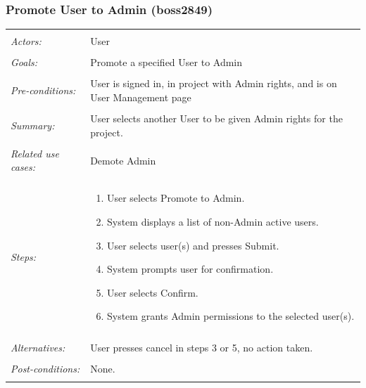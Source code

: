 \documentclass[11pt]{article}
\begin{document}
\subsubsection{Promote User to Admin  (boss2849)}
\begin{tabular}{ p{2cm} p{12cm} }
 \hline
 \\
 \textit{Actors:} & User \\ 
 \\
 \textit{Goals:} & Promote a specified User to Admin \\
 \\
 \textit{Pre-conditions:} & User is signed in, in project with Admin rights, and is on User Management page \\
 \\
 \textit{Summary:} & User selects another User to be given Admin rights for the project. \\ 
 \\
 \textit{Related use cases:} & Demote Admin \\ 
 \\
 \textit{Steps:} & \begin{enumerate}
  \item User selects Promote to Admin.
  \item System displays a list of non-Admin active users.
  \item User selects user(s) and presses Submit.
  \item System prompts user for confirmation.
  \item User selects Confirm.
  \item System grants Admin permissions to the selected user(s).
 \end{enumerate} \\
 \\
 \textit{Alternatives:} & User presses cancel in steps 3 or 5, no action taken. \\
 \\
 \textit{Post-conditions:} & None. \\
 \\
\hline
\end{tabular}
\end{document}
